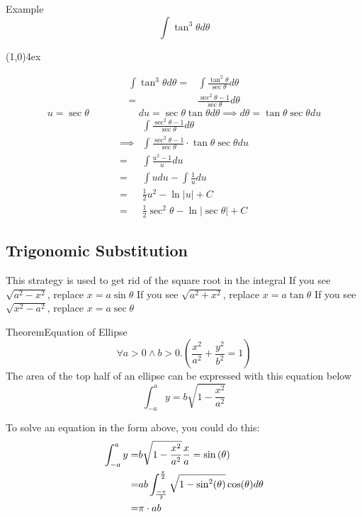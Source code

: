 \documentclass{MathNotes}
\newenvironment{example}[1]{\begin{BlueBox}{Example}{#1}}{\end{BlueBox}}
\newenvironment{theorem}[1]{\begin{GrayBox}{Theorem}{#1}}{\end{GrayBox}}
\newcommand{\br}{
	\begin{center}
		\line(1,0){4ex}
	\end{center}}
\begin{document}
\begin{example}{}
	\[\int\tan^3\theta d\theta\]
	\br
	\begin{align*}
		\int\tan^3\theta d\theta = & \int\frac{\tan^2\theta}{\sec\theta}d\theta \\
		=                          & \frac{\sec^2\theta-1}{\sec\theta}d\theta
	\end{align*}
	\[u=\sec\theta\hspace{5em}du=\sec\theta\tan\theta d\theta\implies d\theta=\tan\theta\sec\theta du\]
	\begin{align*}
		         & \int\frac{\sec^2\theta-1}{\sec\theta}d\theta                      \\
		\implies & \int\frac{\sec^2\theta-1}{\sec\theta}\cdot\tan\theta\sec\theta du \\
		=        & \int\frac{u^2-1}{u}du                                             \\
		=        & \int udu-\int\frac{1}{u}du                                        \\
		=        & \frac{1}{2}u^2-\ln|u|+C                                           \\
		=        & \frac{1}{2}\sec^2\theta-\ln|\sec\theta|+C
	\end{align*}
\end{example}

\subsection{Trigonomic Substitution}
This strategy is used to get rid of the square root in the integral
\newline
If you see $\sqrt{a^2-x^2}$, replace $x=a\sin\theta$
\newline
If you see $\sqrt{a^2+x^2}$, replace $x=a\tan\theta$
\newline
If you see $\sqrt{x^2-a^2}$, replace $x=a\sec\theta$

\begin{theorem}{Equation of Ellipse}
	\[\forall a>0\land b>0.(\frac{x^2}{a^2}+\frac{y^2}{b^2}=1)\]
	The area of the top half of an ellipse can be expressed with this equation below
	\[\int_{-a}^{a}y=b\sqrt{1-\frac{x^2}{a^2}}\]
\end{theorem}

To solve an equation in the form above, you could do this:
\begin{align*}
	\int_{-a}^{a}y = & b\sqrt{1-\frac{x^2}{a^2}} \frac{x}{a}=\sin\left(\theta\right)             \\
	=                & ab\int_{-\pi\over2}^{\pi\over2}\sqrt{1-\sin^2(\theta)}\cos(\theta)d\theta \\
	=                & \pi\cdot ab
\end{align*}
\end{document}
